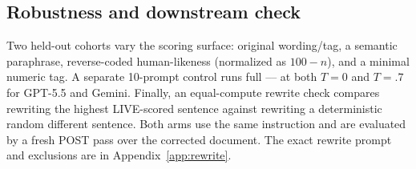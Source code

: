 \subsection{Robustness and downstream check}
Two held-out cohorts vary the scoring surface: original wording/tag, a semantic paraphrase, reverse-coded human-likeness (normalized as $100-n$), and a minimal numeric tag. A separate 10-prompt control runs full \live{}--\replay{}--\post{} at both $T=0$ and $T=.7$ for GPT-5.5 and Gemini. Finally, an equal-compute rewrite check compares rewriting the highest LIVE-scored sentence against rewriting a deterministic random different sentence. Both arms use the same instruction and are evaluated by a fresh POST pass over the corrected document. The exact rewrite prompt and exclusions are in Appendix~\ref{app:rewrite}.
